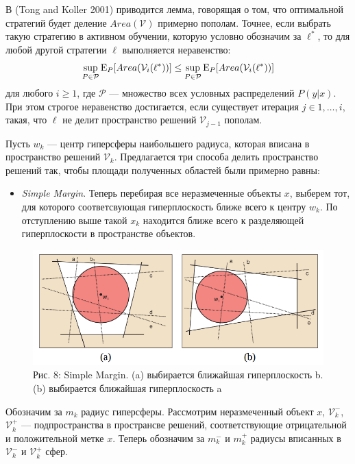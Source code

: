 \documentclass[]{article}
\providecommand{\tightlist}{%
  \setlength{\itemsep}{0pt}\setlength{\parskip}{0pt}}
\begin{document}
В (Tong and Koller 2001) приводится лемма, говорящая о том, что
оптимальной стратегий будет деление \(Area(\mathcal{V})\) примерно
пополам. Точнее, если выбрать такую стратегию в активном обучении,
которую условно обозначим за \(\ell^*\), то для любой другой стратегии
\(\ell\) выполняется неравенство:
\[\sup_{P \in \mathcal{P}} {\rm E}_P[Area(\mathcal{V}_i(\ell^*))] \leq \sup_{P \in \mathcal{P}} {\rm E}_P[Area(\mathcal{V}_i(\ell^*))]\]
для любого \(i \geq 1\), где \(\mathcal{P}\) --- множество всех условных
распределений \(P(y|x)\). При этом строгое неравенство достигается, если
существует итерация \(j \in 1,\ldots, i\), такая, что \(\ell\) не делит
пространство решений \(\mathcal{V}_{j - 1}\) пополам.

Пусть \(w_k\) --- центр гиперсферы наибольшего радиуса, которая вписана
в пространство решений \(\mathcal{V}_k\). Предлагается три способа
делить пространство решений так, чтобы площади полученных областей были
примерно равны:

\begin{itemize}
\tightlist
\item
  \emph{Simple Margin}. Теперь перебирая все неразмеченные объекты
  \(x\), выберем тот, для которого соответсвующая гиперплоскость ближе
  всего к центру \(w_k\). По отступлению выше такой \(x_k\) находится
  ближе всего к разделяющей гиперплоскости в пространстве объектов.
\end{itemize}

\begin{figure}[htbp]
\centering
\includegraphics[width=5.72917in]{img/simplemargin.png}
\caption{Рис. 8: Simple Margin. (a) выбирается ближайшая гиперплоскость
b. (b) выбирается ближайшая гиперплоскость a}
\end{figure}

Обозначим за \(m_k\) радиус гиперсферы. Рассмотрим неразмеченный объект
\(x\), \(\mathcal{V}_k^-\), \(\mathcal{V}_k^+\) --- подпространства в
пространсве решений, соответствующие отрицательной и положительной метке
\(x\). Теперь обозначим за \(m^-_k\) и \(m^+_k\) радиусы вписанных в
\(\mathcal{V}_k^-\) и \(\mathcal{V}_k^+\) сфер.
\end{document}
